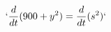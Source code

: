 \documentclass[preview]{standalone}
\begin{document}
\begin{align*}
`\frac{d}{dt}(900 + y^2) = \frac{d}{dt}(s^2)`
\end{align*}
\end{document}
